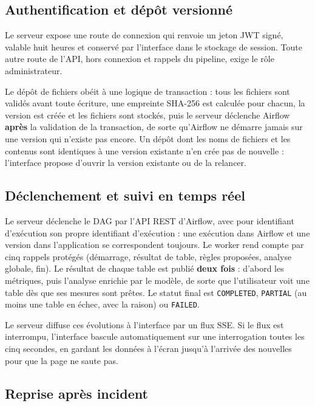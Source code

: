\subsection{Authentification et dépôt versionné}

Le serveur expose une route de connexion qui renvoie un jeton JWT signé, valable huit heures et conservé par l'interface dans le stockage de session. Toute autre route de l'API, hors connexion et rappels du pipeline, exige le rôle administrateur.

Le dépôt de fichiers obéit à une logique de transaction : tous les fichiers sont validés avant toute écriture, une empreinte SHA-256 est calculée pour chacun, la version est créée et les fichiers sont stockés, puis le serveur déclenche Airflow \textbf{après} la validation de la transaction, de sorte qu'Airflow ne démarre jamais sur une version qui n'existe pas encore. Un dépôt dont les noms de fichiers et les contenus sont identiques à une version existante n'en crée pas de nouvelle : l'interface propose d'ouvrir la version existante ou de la relancer.

\subsection{Déclenchement et suivi en temps réel}

Le serveur déclenche le DAG par l'API REST d'Airflow, avec pour identifiant d'exécution son propre identifiant d'exécution : une exécution dans Airflow et une version dans l'application se correspondent toujours. Le worker rend compte par cinq rappels protégés (démarrage, résultat de table, règles proposées, analyse globale, fin). Le résultat de chaque table est publié \textbf{deux fois} : d'abord les métriques, puis l'analyse enrichie par le modèle, de sorte que l'utilisateur voit une table dès que ses mesures sont prêtes. Le statut final est \texttt{COMPLETED}, \texttt{PARTIAL} (au moins une table en échec, avec la raison) ou \texttt{FAILED}.

Le serveur diffuse ces évolutions à l'interface par un flux SSE. Si le flux est interrompu, l'interface bascule automatiquement sur une interrogation toutes les cinq secondes, en gardant les données à l'écran jusqu'à l'arrivée des nouvelles pour que la page ne saute pas.

\subsection{Reprise après incident}

